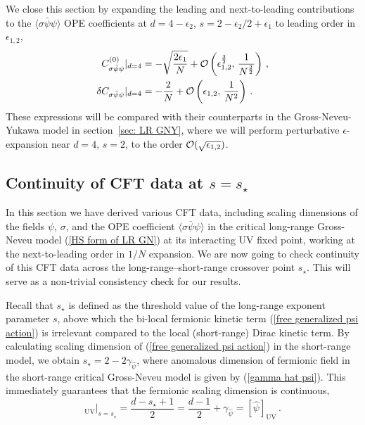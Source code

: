\documentclass[aps,amsmath,amssymb,prd,showpacs,floatfix,preprint,superscriptaddress,nofootinbib,12pt]{article}
\begin{document}
We close this section by expanding the leading and next-to-leading
contributions to the $\langle \sigma\bar\psi\psi\rangle$ OPE
coefficients at $d=4-\epsilon_2$, $s=2-\epsilon_2/2+\epsilon_1$
to leading order in $\epsilon_{1,2}$,
\begin{equation}
\label{expanded result for C sigma psi psi}
\begin{aligned}
C_{\sigma\bar\psi\psi}^{(0)}|_{d=4} &= - \sqrt{\frac{2\epsilon_1}{N}}
+{\cal O}\left(\epsilon_{1,2}^\frac{3}{2},\,\frac{1}{N^\frac{3}{2}}\right)\,,\\
\delta C_{\sigma\bar\psi\psi} |_{d=4}&= -\frac{2}{N}+{\cal O}\left(\epsilon_{1,2},\,\frac{1}{N^2}\right)\,.
\end{aligned}
\end{equation}
These expressions will be compared with their
counterparts in the Gross-Neveu-Yukawa model in section~\ref{sec: LR GNY},
where we will perform perturbative $\epsilon$-expansion
near $d=4$, $s=2$, to the order ${\cal O}(\sqrt{\epsilon_{1,2}})$.


\subsection{Continuity of CFT data at $s=s_\star$}
\label{sec:continuity}

In this section we have derived various CFT data,
including scaling dimensions of the fields $\psi$, $\sigma$,
and the OPE coefficient $\langle\sigma\bar\psi\psi\rangle$
in the critical long-range Gross-Neveu model (\ref{HS form of LR GN})
at its interacting UV fixed point, working at the next-to-leading order in $1/N$ expansion. We are now going to check
continuity of this CFT data across the long-range--short-range
crossover point $s_\star$. This will serve as a non-trivial consistency
check for our results.

Recall that $s_\star$ is defined
as the threshold value of the long-range exponent parameter $s$,
above which the bi-local fermionic kinetic term (\ref{free generalized psi action}) is
irrelevant compared to the local (short-range) Dirac kinetic term. By calculating  scaling dimension of (\ref{free generalized psi action}) in the short-range model,
we obtain $s_\star = 2-2\gamma_{\hat\psi}$, where anomalous dimension
of fermionic field in the short-range critical Gross-Neveu model is
given by (\ref{gamma hat psi}). This immediately guarantees that the fermionic scaling dimension
is continuous,
\begin{equation}
[\psi]_{\textrm{UV}}|_{s=s_\star} = \frac{d-s_\star+1}{2}=\frac{d-1}{2}+\gamma_{\hat\psi}=[\hat \psi]_{\textrm{UV}}\,.
\end{equation}
\end{document}
